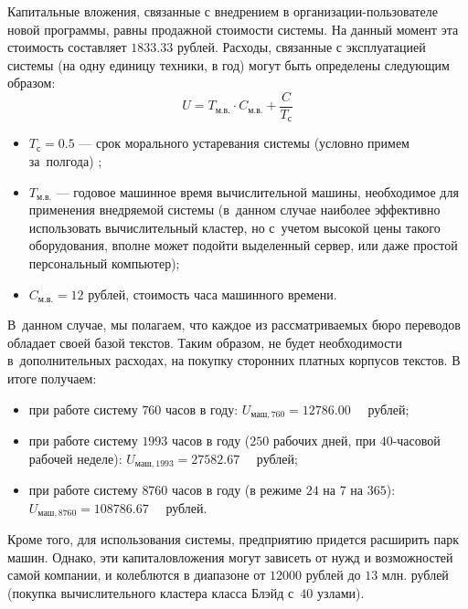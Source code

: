Капитальные вложения, связанные с внедрением 
в организации-пользователе новой программы, 
равны продажной стоимости системы. 
На данный момент эта стоимость составляет $1833.33$  рублей. 
Расходы, связанные с эксплуатацией системы (на одну единицу техники, в год) могут быть определены следующим образом:
\[
	U = T_{\text{м.в.}} \cdot C_{\text{м.в.}}  + \dfrac{C}{T_{с}} 
\]
\begin{itemize}
	\item  $T_{с} = 0.5 $ --- срок морального устаревания системы (условно примем за~полгода) ;
	\item  $T_{\text{м.в.}}$  --- годовое машинное время вычислительной машины, 
		необходимое для применения внедряемой системы 
			(в~данном случае наиболее эффективно использовать вычислительный кластер, 
			но с~учетом высокой цены такого оборудования, 
			вполне может подойти выделенный сервер, 
			или даже простой персональный компьютер);
	\item $C_{\text{м.в.}}  = 12 $ рублей, стоимость часа машинного времени.
\end{itemize}

В~данном случае, мы полагаем, что каждое из рассматриваемых бюро переводов обладает своей базой текстов.
Таким образом, не будет необходимости
в~дополнительных расходах, на покупку сторонних платных корпусов текстов.
В итоге получаем:
\begin{itemize}
	\item  при работе систему $760$ часов в году:
		$
			U_{\text{маш}, 760} = 12786.00 \quad \text{ рублей}
		$;
	\item  при работе систему $1993$ часов в году ($250$ рабочих дней, при $40$-часовой рабочей неделе):
		$
			U_{\text{маш}, 1993} = 27582.67 \quad \text{ рублей}
		$;
	\item  при работе систему $8760$ часов в году (в режиме $24$ на $7$ на $365$):
		$
			U_{\text{маш}, 8760} = 108786.67 \quad \text{ рублей}
		$.
\end{itemize}

Кроме того, для использования системы, предприятию придется расширить парк машин.
Однако, эти капиталовложения могут зависеть от нужд и возможностей самой компании,
и колеблются в диапазоне от $12000$ рублей до $13$ млн. рублей 
(покупка вычислительного кластера класса Блэйд с~$40$ узлами). 

